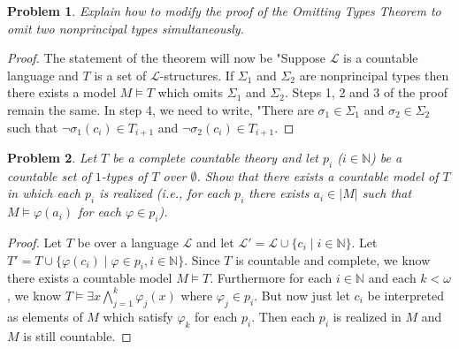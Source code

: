 \documentclass{article}
\newtheorem{problem}{Problem}
\begin{document}
\begin{problem}
Explain how to modify the proof of the Omitting Types Theorem to omit \emph{two} nonprincipal types simultaneously.
\end{problem}
\begin{proof}
The statement of the theorem will now be "Suppose $\mathcal{L}$ is a countable language and $T$ is a set of $\mathcal{L}$-structures. If $\Sigma_1$ and $\Sigma_2$ are nonprincipal types then there exists a model $M \models T$ which omits $\Sigma_1$ and $\Sigma_2$. Steps 1, 2 and 3 of the proof remain the same. In step 4, we need to write, "There are $\sigma_1 \in \Sigma_1$ and $\sigma_2 \in \Sigma_2$ such that $\neg \sigma_1(c_i) \in T_{i+1}$ and $\neg \sigma_2(c_i) \in T_{i+1}$.
\end{proof}

\begin{problem}
Let $T$ be a complete countable theory and let $p_i$ ($i \in \mathbb{N}$) be a countable set of $1$-types of $T$ over $\emptyset$. Show that there exists a countable model of $T$ in which each $p_i$ is realized (i.e., for each $p_i$ there exists $a_i \in |M|$ such that $M \models \varphi(a_i)$ for each $\varphi \in p_i$).
\end{problem}
\begin{proof}
Let $T$ be over a language $\mathcal{L}$ and let $\mathcal{L}' = \mathcal{L} \cup \{c_i \mid i \in \mathbb{N}\}$. Let $T' = T \cup \{\varphi(c_i) \mid \varphi \in p_i, i \in \mathbb{N}\}$. Since $T$ is countable and complete, we know there exists a countable model $M \models T$. Furthermore for each $i \in \mathbb{N}$ and each $k < \omega$, we know $T \models \exists x \bigwedge_{j = 1}^{k} \varphi_j(x)$ where $\varphi_j \in p_i$. But now just let $c_i$ be interpreted as elements of $M$ which satisfy $\varphi_k$ for each $p_i$. Then each $p_i$ is realized in $M$ and $M$ is still countable.
\end{proof}
\end{document}
